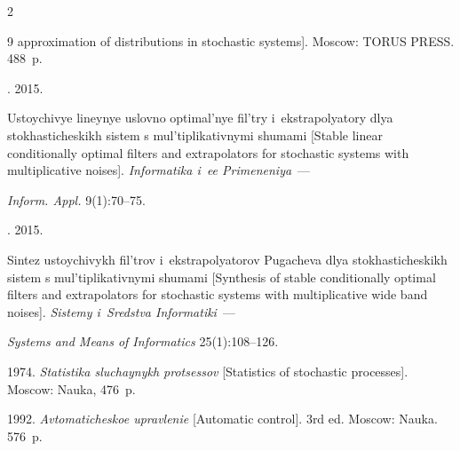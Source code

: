 \begin{multicols}{2}
{{\begin{thebibliography}{9}
approximation of distributions in stochastic systems]. Moscow: TORUS PRESS. 488~p.




. 2015.

Ustoychivye lineynye uslovno optimal'nye fil'try i~ekstrapolyatory dlya stokhasticheskikh sistem s mul'tiplikativnymi shumami [Stable linear conditionally optimal filters and extrapolators for stochastic systems with multiplicative noises]. \textit{Informatika i~ee Primeneniya}~---

 \textit{Inform. Appl.}  9(1):70--75.







 . 2015.

Sintez ustoychivykh fil'trov i~ekstrapolyatorov Pugacheva dlya sto\-kha\-sti\-che\-skikh sistem s mul'tiplikativnymi shumami [Synthesis of stable conditionally optimal filters and extrapolators for stochastic systems with multiplicative wide band noises]. \textit{Sistemy i~Sredstva Informatiki}~---

\textit{Systems and Means of Informatics}  25(1):108--126.








 1974. \textit{Statistika sluchaynykh protsessov} [Statistics of stochastic processes].  Moscow: Nauka,  476~p.



\vspace*{-3pt}




 1992. \textit{Avtomaticheskoe upravlenie} [Automatic control]. 3rd ed. Moscow: Nauka. 576~p.



\end{thebibliography}



 }

 }



\end{multicols}



